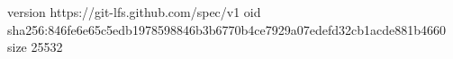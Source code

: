 version https://git-lfs.github.com/spec/v1
oid sha256:846fe6e65c5edb1978598846b3b6770b4ce7929a07edefd32cb1acde881b4660
size 25532

